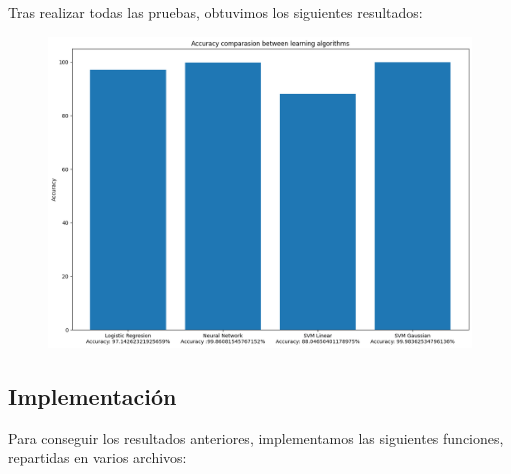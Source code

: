 \documentclass[11pt]{article}
\begin{document}
Tras realizar todas las pruebas, obtuvimos los siguientes resultados:

 \begin{figure}[H]
    \begin{center}
    \includegraphics[width=\textwidth]{Results/FinalGraph.png}
    \end{center}
 \end{figure}
 
 \newpage
 \subsection{Implementación}
Para conseguir los resultados anteriores, implementamos las siguientes funciones, repartidas en varios archivos:








\end{document}
